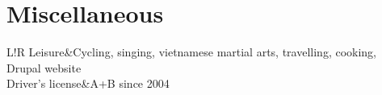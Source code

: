 \documentclass[11pt]{article}
\newcommand\VRule{\color{lightgray}\vrule width 0.5pt}
\begin{document}
 
\section*{Miscellaneous}
\begin{tabular}{L!{\VRule}R}
Leisure&Cycling, singing, vietnamese martial arts, 
travelling, cooking, Drupal website\\
Driver's license&A+B since 2004\\
\end{tabular}

    
\renewcommand{\refname}{Publications}
\begingroup
    \fontsize{9pt}{11pt}\selectfont
\end{document}

